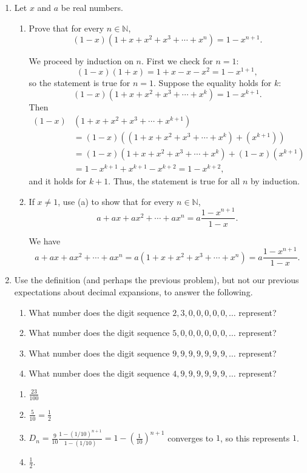 \documentclass[12pt]{amsart}
\newcommand{\N}{\mathbb{N}}
\numberwithin{equation}{section}
\theoremstyle{plain} %
\theoremstyle{definition}
\theoremstyle{remark}
\begin{document}
\begin{enumerate}
\item Let $x$ and $a$ be real numbers.
\begin{enumerate}
\item Prove that for every $n\in \N$,
\[ (1-x) (1+x +x^2 + x^3 +\cdots + x^n ) = 1 - x^{n+1}.\]
\begin{framed}
We proceed by induction on $n$. First we check for $n=1$:
\[ (1-x)(1+x) = 1+ x - x -x^2 = 1-x^{1+1},\]
so the statement is true for $n=1$.
Suppose the equality holds for $k$:
\[(1-x) (1+x +x^2 + x^3 +\cdots + x^k ) = 1 - x^{k+1}.\]
Then
\begin{align*}
(1-x)& (1+x +x^2 + x^3 +\cdots + x^{k+1} ) \\
&=(1-x)((1+x +x^2 + x^3 +\cdots + x^{k} )  + (x^{k+1}))
\\&=(1-x)(1+x +x^2 + x^3 +\cdots + x^{k} )  + (1-x) (x^{k+1})
\\&= 1 - x^{k+1} + x^{k+1} - x^{k+2} = 1-x^{k+2},
\end{align*}
and it holds for $k+1$. Thus, the statement is true for all $n$ by induction.
\end{framed}
\item If $x\neq 1$, use (a) to show that for every $n\in \N$,
\[ a + ax + ax^2 + \cdots + a x^n = a \frac{1-x^{n+1}}{1-x}.\]
\begin{framed}
We have \[ a + ax + ax^2 + \cdots + a x^n = a (1+x +x^2 + x^3 +\cdots + x^n) = a  \frac{1-x^{n+1}}{1-x}.\]
\end{framed}
\end{enumerate}

\item Use the definition (and perhaps the previous problem), but not our previous expectations about decimal expansions, to answer the following.
\begin{enumerate}
\item What number does the digit sequence $2,3,0,0,0,0,0,\dots$ represent?
\item What number does the digit sequence $5,0,0,0,0,0,0,\dots$ represent?
\item What number does the digit sequence $9,9,9,9,9,9,9,\dots$ represent?
\item What number does the digit sequence $4,9,9,9,9,9,9,\dots$ represent?
\end{enumerate}
\begin{framed}
\begin{enumerate}
\item $\frac{23}{100}$
\item $\frac{5}{10} = \frac{1}{2}$
\item $D_n = \frac{9}{10} \frac{1- (1/10)^{n+1}}{1-(1/10)} =  1- (\frac{1}{10} )^{n+1}$ converges to $1$, so this represents $1$.
\item $\frac{1}{2}$.
\end{enumerate}
\end{framed}


\end{enumerate}
\end{document}
